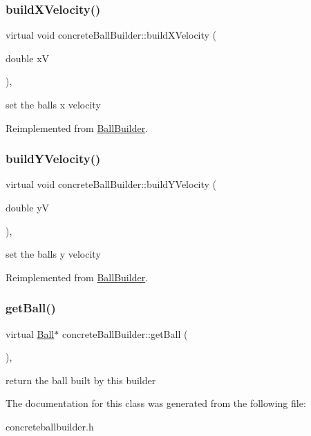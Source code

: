 \subsubsection{\texorpdfstring{build\+X\+Velocity()}{buildXVelocity()}}
{\footnotesize\ttfamily virtual void concrete\+Ball\+Builder\+::build\+X\+Velocity (\begin{DoxyParamCaption}\item[{double}]{xV }\end{DoxyParamCaption})\hspace{0.3cm}{\ttfamily [inline]}, {\ttfamily [virtual]}}

set the ball\textquotesingle{}s x velocity 

Reimplemented from \mbox{\hyperlink{class_ball_builder_a9139eedc191ad41fa221f06902646d4b}{Ball\+Builder}}.

\mbox{\label{classconcrete_ball_builder_a6054b9012af3247b16f2e1c4040555cb}} 
\subsubsection{\texorpdfstring{build\+Y\+Velocity()}{buildYVelocity()}}
{\footnotesize\ttfamily virtual void concrete\+Ball\+Builder\+::build\+Y\+Velocity (\begin{DoxyParamCaption}\item[{double}]{yV }\end{DoxyParamCaption})\hspace{0.3cm}{\ttfamily [inline]}, {\ttfamily [virtual]}}

set the ball\textquotesingle{}s y velocity 

Reimplemented from \mbox{\hyperlink{class_ball_builder_a1687bc4c363f259dd38b0d7d6ac92e57}{Ball\+Builder}}.

\mbox{\label{classconcrete_ball_builder_a31311259bb9ba3580b4a0b190cbc938b}} 
\subsubsection{\texorpdfstring{get\+Ball()}{getBall()}}
{\footnotesize\ttfamily virtual \mbox{\hyperlink{class_ball}{Ball}}$\ast$ concrete\+Ball\+Builder\+::get\+Ball (\begin{DoxyParamCaption}{ }\end{DoxyParamCaption})\hspace{0.3cm}{\ttfamily [inline]}, {\ttfamily [virtual]}}

return the ball built by this builder 

The documentation for this class was generated from the following file\+:\begin{DoxyCompactItemize}
\item 
concreteballbuilder.\+h\end{DoxyCompactItemize}

